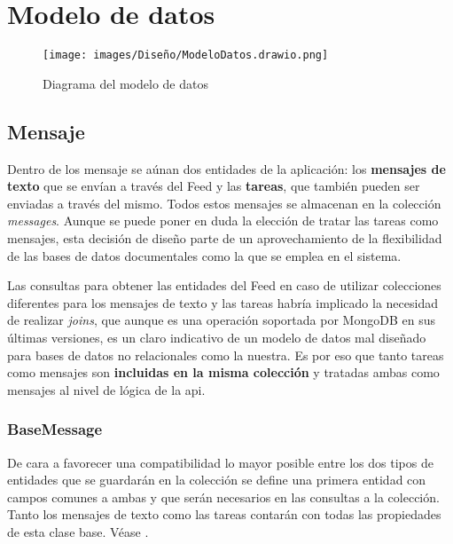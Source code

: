 \chapter{Modelo de datos}
\label{ch:modelo_datos}

\begin{figure}[H]
    \centering
    \texttt{[image: images/Diseño/ModeloDatos.drawio.png]}
    \caption{Diagrama del modelo de datos}
    \label{fig:diagrama_modelo_datos}
\end{figure}

\section{Mensaje}

Dentro de los mensaje se aúnan dos entidades de la aplicación: los \textbf{mensajes de texto} que se envían a través del Feed y las \textbf{tareas}, que también pueden ser enviadas a través del mismo. Todos estos mensajes se almacenan en la colección \emph{messages}. Aunque se puede poner en duda la elección de tratar las tareas como mensajes, esta decisión de diseño parte de un aprovechamiento de la flexibilidad de las bases de datos documentales como la que se emplea en el sistema.

Las consultas para obtener las entidades del Feed en caso de utilizar colecciones diferentes para los mensajes de texto y las tareas habría implicado la necesidad de realizar \emph{\glspl{join}}, que aunque es una operación soportada por MongoDB en sus últimas versiones, es un claro indicativo de un modelo de datos mal diseñado para bases de datos no relacionales como la nuestra. Es por eso que tanto tareas como mensajes son \textbf{incluidas en la misma colección} y tratadas ambas como mensajes al nivel de lógica de la \acrshort{api}.

\subsection{BaseMessage}

De cara a favorecer una compatibilidad lo mayor posible entre los dos tipos de entidades que se guardarán en la colección se define una primera entidad con campos comunes a ambas y que serán necesarios en las consultas a la colección. Tanto los mensajes de texto como las tareas contarán con todas las propiedades de esta clase base. Véase .

